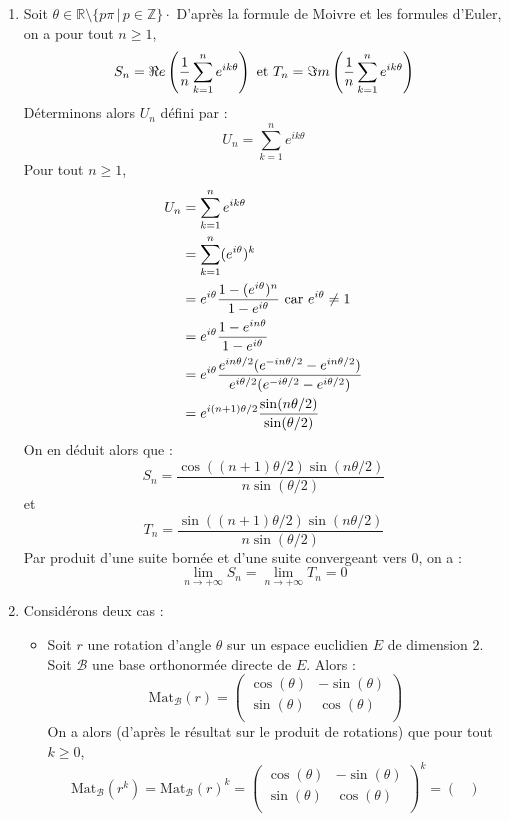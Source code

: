 \documentclass[a4paper,twoside,french,11pt]{VcCours}
\begin{document}
\begin{enumerate}
\item Soit $\theta \in \mathbb{R} \setminus \lbrace p \pi \, \vert \, p \in \mathbb{Z} \rbrace \cdot$ D'après la formule de Moivre et les formules d'Euler, on a pour tout $n \geq 1$,
$$ S_n = \Re e \left(  \dfrac{1}{n} \sum_{k=1}^n e^{ik \theta} \right) \hbox{ et }  T_n = \Im m \left(  \dfrac{1}{n} \sum_{k=1}^n e^{ik \theta} \right)$$
Déterminons alors $U_n$ défini par :
$$ U_n =  \sum_{k=1}^n e^{ik \theta}$$
Pour tout $n \geq 1$,
\begin{align*}
U_n & =  \sum_{k=1}^n e^{ik \theta} \\
& =  \sum_{k=1}^n (e^{i \theta})^k \\
& = e^{i \theta}  \dfrac{1-(e^{i \theta})^n}{1- e^{i \theta}} \hbox{ car } e^{i \theta} \neq 1 \\
& = e^{i \theta} \dfrac{1-e^{i n\theta}}{1- e^{i \theta}} \\
& = e^{i \theta} \dfrac{e^{i n \theta/2} (e^{-i n \theta/2} -e^{i n\theta/2})}{e^{i  \theta/2} (e^{-i  \theta/2} -e^{i \theta/2})} \\
& = e^{i (n+1) \theta/2} \dfrac{\sin(n \theta/2)}{\sin(\theta/2)}
\end{align*}
On en déduit alors que :
$$ S_n =  \dfrac{\cos((n+1) \theta/2)  \sin(n \theta/2)}{n\sin(\theta/2)}$$
et 
$$ T_n = \dfrac{\sin((n+1) \theta/2)  \sin(n \theta/2)}{n\sin(\theta/2)}$$
Par produit d'une suite bornée et d'une suite convergeant vers $0$, on a :
$$ \lim_{n \rightarrow + \infty} S_n = \lim_{n \rightarrow + \infty} T_n =0$$
\item Considérons deux cas :
\begin{itemize}
\item Soit $r$ une rotation d'angle $\theta$ sur un espace euclidien $E$ de dimension $2$. Soit $\mathcal{B}$ une base orthonormée directe de $E$. Alors :
$$ \textrm{Mat}_{\mathcal{B}}(r) = \begin{pmatrix}
\cos(\theta) & - \sin(\theta) \\
\sin(\theta) & \cos(\theta) \\
\end{pmatrix}$$
On a alors (d'après le résultat sur le produit de rotations) que pour tout $k \geq 0$,
$$ \textrm{Mat}_{\mathcal{B}}(r^k) =\textrm{Mat}_{\mathcal{B}}(r)^k = \begin{pmatrix}
\cos(\theta) & - \sin(\theta) \\
\sin(\theta) & \cos(\theta) \\
\end{pmatrix}^k = \begin{pmatrix}

\end{pmatrix}$$
\end{itemize}
\end{enumerate}
\end{document}
